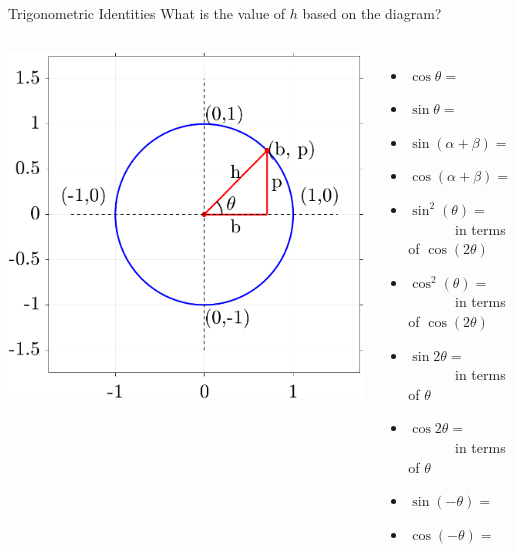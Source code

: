 \documentclass[aspectratio=169,xcolor=dvipsnames,svgnames,x11names,fleqn]{beamer}
\begin{document}
\begin{frame}{Trigonometric Identities}
What is the value of $h$ based on the diagram?
    \begin{columns}
 \includegraphics[width=0.99\linewidth, trim=2cm 2cm 1cm 1cm,clip]{figures/unit_circle_right_triangle.png}
        \begin{itemize}
            \item $\cos\theta =  $
            \item $\sin\theta = $
            \item $\sin(\alpha + \beta) = $
            \item $\cos(\alpha + \beta) = $
             \item $\sin^2(\theta) = $ $\quad\quad\quad$ in terms of $\cos(2\theta)$
              \item $\cos^2(\theta) = $ $\quad\quad\quad$ in terms of $\cos(2\theta)$
              \item $\sin 2\theta = $ $\quad\quad\quad$ in terms of $\theta$
              \item $\cos 2\theta = $ $\quad\quad\quad$ in terms of $\theta$
              \item $\sin (-\theta) = $
              \item $\cos(-\theta) = $
              
            
        \end{itemize}
    \end{columns}
\end{frame}
\end{document}
